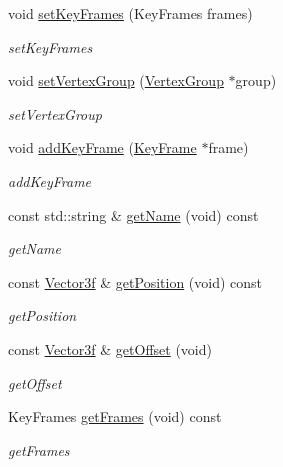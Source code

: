 \begin{DoxyCompactItemize}
\item 
void \hyperlink{classEngine_1_1Bone_a31f669188801946033a4cd2704253028}{set\+Key\+Frames} (Key\+Frames frames)
\begin{DoxyCompactList}\small\item\em set\+Key\+Frames \end{DoxyCompactList}\item 
void \hyperlink{classEngine_1_1Bone_a54e2cf46c426ab8fa787e4f1cc27829d}{set\+Vertex\+Group} (\hyperlink{classEngine_1_1VertexGroup}{Vertex\+Group} $\ast$group)
\begin{DoxyCompactList}\small\item\em set\+Vertex\+Group \end{DoxyCompactList}\item 
void \hyperlink{classEngine_1_1Bone_a710598e6b40ae08fa8b5e14b1e010351}{add\+Key\+Frame} (\hyperlink{classEngine_1_1KeyFrame}{Key\+Frame} $\ast$frame)
\begin{DoxyCompactList}\small\item\em add\+Key\+Frame \end{DoxyCompactList}\item 
const std\+::string \& \hyperlink{classEngine_1_1Bone_a6f332bea5d510644687ccfec8604350c}{get\+Name} (void) const 
\begin{DoxyCompactList}\small\item\em get\+Name \end{DoxyCompactList}\item 
const \hyperlink{classVector3}{Vector3f} \& \hyperlink{classEngine_1_1Bone_a55e9791c1f09e1b0ef6f18662dbc3351}{get\+Position} (void) const 
\begin{DoxyCompactList}\small\item\em get\+Position \end{DoxyCompactList}\item 
const \hyperlink{classVector3}{Vector3f} \& \hyperlink{classEngine_1_1Bone_a60208f0fa2aa5853df588316c2f9f86d}{get\+Offset} (void)
\begin{DoxyCompactList}\small\item\em get\+Offset \end{DoxyCompactList}\item 
Key\+Frames \hyperlink{classEngine_1_1Bone_a8470ce520de7caa512a3198f7756b95e}{get\+Frames} (void) const 
\begin{DoxyCompactList}\small\item\em get\+Frames \end{DoxyCompactList}\item 

\end{DoxyCompactItemize}
